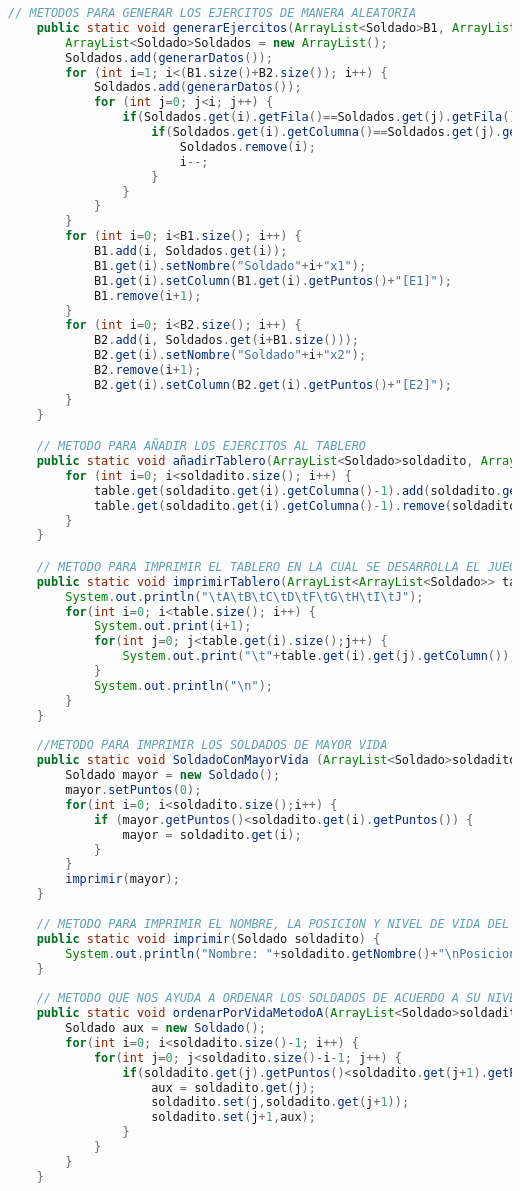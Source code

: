 \documentclass{article}
\begin{document}
\begin{itemize}
\begin{itemize}
\begin{lstlisting}[language=java]
	// METODOS PARA GENERAR LOS EJERCITOS DE MANERA ALEATORIA
	public static void generarEjercitos(ArrayList<Soldado>B1, ArrayList<Soldado>B2) {
		ArrayList<Soldado>Soldados = new ArrayList();
		Soldados.add(generarDatos());
		for (int i=1; i<(B1.size()+B2.size()); i++) {
			Soldados.add(generarDatos());
			for (int j=0; j<i; j++) {
				if(Soldados.get(i).getFila()==Soldados.get(j).getFila()) {
					if(Soldados.get(i).getColumna()==Soldados.get(j).getColumna()){
						Soldados.remove(i);
						i--;
					}
				}
			}
		}
		for (int i=0; i<B1.size(); i++) {
			B1.add(i, Soldados.get(i));
			B1.get(i).setNombre("Soldado"+i+"x1");
			B1.get(i).setColumn(B1.get(i).getPuntos()+"[E1]");
			B1.remove(i+1);
		}
		for (int i=0; i<B2.size(); i++) {
			B2.add(i, Soldados.get(i+B1.size()));
			B2.get(i).setNombre("Soldado"+i+"x2");
			B2.remove(i+1);
			B2.get(i).setColumn(B2.get(i).getPuntos()+"[E2]");
		}
	}

	// METODO PARA AÑADIR LOS EJERCITOS AL TABLERO
	public static void añadirTablero(ArrayList<Soldado>soldadito, ArrayList<ArrayList<Soldado>>table) {
		for (int i=0; i<soldadito.size(); i++) {
			table.get(soldadito.get(i).getColumna()-1).add(soldadito.get(i).getFila()-1,soldadito.get(i));
			table.get(soldadito.get(i).getColumna()-1).remove(soldadito.get(i).getFila());
		}
	}

	// METODO PARA IMPRIMIR EL TABLERO EN LA CUAL SE DESARROLLA EL JUEGO
	public static void imprimirTablero(ArrayList<ArrayList<Soldado>> table) {
		System.out.println("\tA\tB\tC\tD\tF\tG\tH\tI\tJ");
		for(int i=0; i<table.size(); i++) {
			System.out.print(i+1);
			for(int j=0; j<table.get(i).size();j++) {
				System.out.print("\t"+table.get(i).get(j).getColumn());
			}
			System.out.println("\n");
		}
	}
	
	//METODO PARA IMPRIMIR LOS SOLDADOS DE MAYOR VIDA
	public static void SoldadoConMayorVida (ArrayList<Soldado>soldadito) {
		Soldado mayor = new Soldado();
		mayor.setPuntos(0);
		for(int i=0; i<soldadito.size();i++) {
			if (mayor.getPuntos()<soldadito.get(i).getPuntos()) {
				mayor = soldadito.get(i);
			}
		}
		imprimir(mayor);
	}
	
	// METODO PARA IMPRIMIR EL NOMBRE, LA POSICION Y NIVEL DE VIDA DEL SOLDADO
	public static void imprimir(Soldado soldadito) {
		System.out.println("Nombre: "+soldadito.getNombre()+"\nPosicion: "+soldadito.getColumna()+"X"+soldadito.getFila()+"\tVida: "+soldadito.getPuntos());
	}
	
	// METODO QUE NOS AYUDA A ORDENAR LOS SOLDADOS DE ACUERDO A SU NIVEL DE VIDA, USUANDO UN ALGORITMO DE ORDENAMIENTO DE BURBUJA
	public static void ordenarPorVidaMetodoA(ArrayList<Soldado>soldadito) {
		Soldado aux = new Soldado();
		for(int i=0; i<soldadito.size()-1; i++) {
			for(int j=0; j<soldadito.size()-i-1; j++) {
				if(soldadito.get(j).getPuntos()<soldadito.get(j+1).getPuntos()) {
					aux = soldadito.get(j);
					soldadito.set(j,soldadito.get(j+1));
					soldadito.set(j+1,aux);
				}
			}
		}
	}


\end{lstlisting}
\end{itemize}
\end{itemize}
\end{document}
